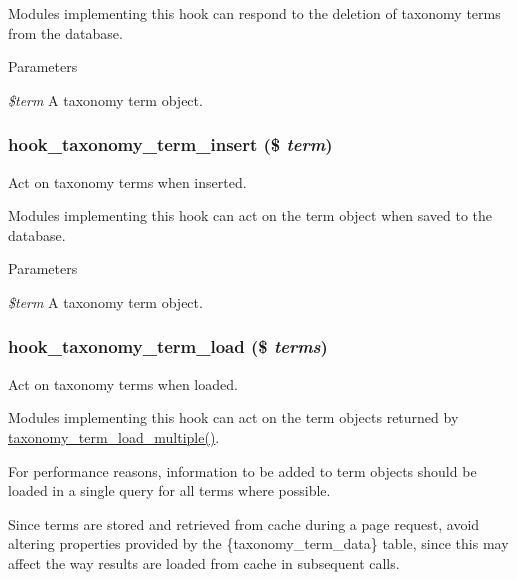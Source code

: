 Modules implementing this hook can respond to the deletion of taxonomy terms from the database.


\begin{DoxyParams}{Parameters}
\item[{\em \$term}]A taxonomy term object. \end{DoxyParams}
\hypertarget{group__hooks_gabab3537accc8ce17fe2cd0f73f4bb817}{
\subsubsection[{hook\_\-taxonomy\_\-term\_\-insert}]{\setlength{\rightskip}{0pt plus 5cm}hook\_\-taxonomy\_\-term\_\-insert (\$ {\em term})}}
\label{group__hooks_gabab3537accc8ce17fe2cd0f73f4bb817}
Act on taxonomy terms when inserted.

Modules implementing this hook can act on the term object when saved to the database.


\begin{DoxyParams}{Parameters}
\item[{\em \$term}]A taxonomy term object. \end{DoxyParams}
\hypertarget{group__hooks_ga043d5ebe3d15a7ff5a84e8016a96467f}{
\subsubsection[{hook\_\-taxonomy\_\-term\_\-load}]{\setlength{\rightskip}{0pt plus 5cm}hook\_\-taxonomy\_\-term\_\-load (\$ {\em terms})}}
\label{group__hooks_ga043d5ebe3d15a7ff5a84e8016a96467f}
Act on taxonomy terms when loaded.

Modules implementing this hook can act on the term objects returned by \hyperlink{taxonomy_8module_add67d5d48fc273cf997a650cfb376cda}{taxonomy\_\-term\_\-load\_\-multiple()}.

For performance reasons, information to be added to term objects should be loaded in a single query for all terms where possible.

Since terms are stored and retrieved from cache during a page request, avoid altering properties provided by the \{taxonomy\_\-term\_\-data\} table, since this may affect the way results are loaded from cache in subsequent calls.


